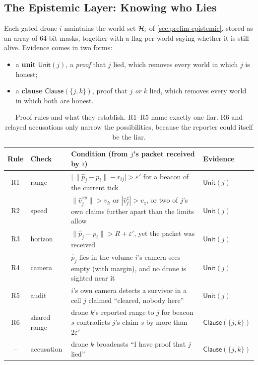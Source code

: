 \subsection{The Epistemic Layer: Knowing who Lies}
\label{sec:epistemic}

Each gated drone $i$ maintains the world set $\mathcal{H}_i$ of \autoref{sec:prelim-epistemic}, stored as an array of
64-bit masks, together with a flag per world saying whether it is still alive. Evidence comes in two forms:
\begin{itemize}
    \item a \textbf{unit} $\mathsf{Unit}(j)$, a \emph{proof} that $j$ lied, which removes every world in which $j$ is honest;
    \item a \textbf{clause} $\mathsf{Clause}(\{j,k\})$, proof that $j$ \emph{or} $k$ lied, which removes every world
          in which both are honest.
\end{itemize}

\begin{table}[h]
\centering
\renewcommand{\arraystretch}{1.3}
\begin{tabularx}{\linewidth}{@{}c l X l@{}}
\toprule
\textbf{Rule} & \textbf{Check} & \textbf{Condition (from $j$'s packet received by $i$)} & \textbf{Evidence} \\
\midrule
R1 & range   & $\big|\,\|\hat p_j-p_i\| - r_{ij}\big| > \varepsilon'$ for a beacon of the current tick & $\mathsf{Unit}(j)$ \\
R2 & speed   & $\|\hat v_j^{xy}\|>v_h$ or $|\hat v_j^z|>v_z$, or two of $j$'s own claims further apart than the limits allow & $\mathsf{Unit}(j)$ \\
R3 & horizon & $\|\hat p_j-p_i\|>R+\varepsilon'$, yet the packet was received & $\mathsf{Unit}(j)$ \\
R4 & camera  & $\hat p_j$ lies in the volume $i$'s camera sees empty (with margin), and no drone is sighted near it & $\mathsf{Unit}(j)$ \\
R5 & audit   & $i$'s own camera detects a survivor in a cell $j$ claimed ``cleared, nobody here'' & $\mathsf{Unit}(j)$ \\
R6 & shared range & drone $k$'s reported range to $j$ for beacon $s$ contradicts $j$'s claim $s$ by more than $2\varepsilon'$ & $\mathsf{Clause}(\{j,k\})$ \\
-- & accusation & drone $k$ broadcasts ``I have proof that $j$ lied'' & $\mathsf{Clause}(\{j,k\})$ \\
\bottomrule
\end{tabularx}
\caption[Proof rules R1--R6 and accusations]{Proof rules and what they establish. R1--R5 name exactly one liar. R6
and relayed accusations only narrow the possibilities, because the reporter could itself be the liar.}
\label{tab:rules}
\end{table}

